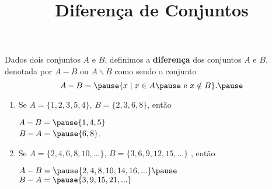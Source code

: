 \documentclass{beamer}
\title{Diferen\c{c}a de Conjuntos}
\author[\autor]{\autor}
\institute[\instituto]{\instituto}
\date{}
\begin{document}
    \begin{frame}
        \maketitle
    \end{frame}


    \begin{frame}
        \begin{definicao}
            Dados dois conjuntos $A$ e $B$, \pause definimos a \textbf{diferen{\c c}a} \pause dos conjuntos $A$ e $B$, denotada por \pause $A - B$ ou $A \backslash B$ \pause como sendo o conjunto\pause
            \[
                A - B = \pause \{x \mid x \in A \pause \mbox{ e } x \notin B\}.\pause
            \]
        \end{definicao}

        \begin{exemplos}
            \begin{enumerate}[label={\arabic*})]
                \item Se $A=\{1,2,3,5,4\}$, \pause $B=\{2,3,6,8\}$, \pause ent\~ao
                \begin{center}
                    $A - B = \pause \{1,4,5\}$\pause\\
                    $B - A = \pause \{6,8\}$.\pause
                \end{center}
                \item Se $A=\{2,4,6,8,10,...\}$, \pause $B=\{3,6,9,12,15,...\}$ \pause, ent\~ao\pause
                \begin{center}
                    $A - B = \pause \{2,4,8,10,14,16,...\}\pause$\\
                    $B - A = \pause \{3,9,15,21,...\}$
                 \end{center}
            \end{enumerate}
        \end{exemplos}
    \end{frame}
\end{document}
